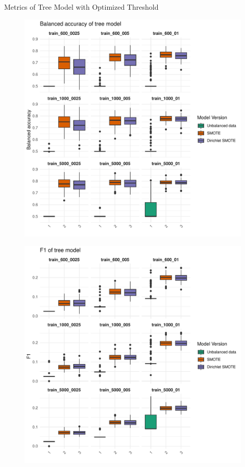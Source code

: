 \documentclass{beamer}
\begin{document}
\begin{frame}{Metrics of Tree Model with Optimized Threshold}
  \begin{figure}
    \begin{minipage}{0.42\textwidth}
      \centering
      \includegraphics[width=\linewidth]{images/Tree_balanced_accuracy_optimized_threshold.pdf}
      \label{fig:label8}
    \end{minipage}
    \hfill
    \begin{minipage}{0.42\textwidth}
      \centering
      \includegraphics[width=\linewidth]{images/Tree_f1_optimized_threshold.pdf}

\end{minipage}
\end{figure}
\end{frame}
\end{document}
